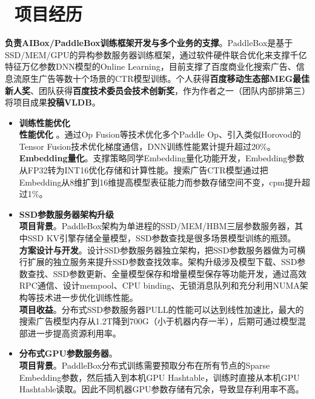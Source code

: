 \documentclass{resume}
\begin{document}
\section{\faUsers\ 项目经历}
\begin{onehalfspacing}
\textbf{负责AIBox/PaddleBox训练框架开发与多个业务的支撑}。PaddleBox是基于SSD/MEM/GPU的异构参数服务器训练框架，通过软件硬件联合优化来支撑千亿特征万亿参数DNN模型的Online Learning，目前支撑了百度商业化搜索广告、信息流原生广告等数十个场景的CTR模型训练。个人获得\textbf{百度移动生态部MEG最佳新人奖}、团队获得\textbf{百度技术委员会技术创新奖}，作为作者之一（团队内部排第三）将项目成果\textbf{投稿VLDB}。
\begin{itemize}%
\item \textbf{训练性能优化}
\\  \textbf{性能优化} 。通过Op Fusion等技术优化多个Paddle Op、引入类似Horovod的Tensor Fusion技术优化梯度通信，DNN训练性能累计提升超过20\%。
\\  \textbf{Embedding量化}。支撑策略同学Embedding量化功能开发，Embedding参数从FP32转为INT16优化存储和计算性能。搜索广告CTR模型通过把Embedding从8维扩到16维提高模型表征能力而参数存储空间不变，cpm提升超过1\%。
\item \textbf{SSD参数服务器架构升级}
\\ \textbf{项目背景}。PaddleBox架构为单进程的SSD/MEM/HBM三层参数服务器，其中SSD KV引擎存储全量模型，SSD参数查找是很多场景模型训练的瓶颈。%
\\ \textbf{方案设计与开发}。设计SSD参数服务器独立架构，把SSD参数服务器做为可横行扩展的独立服务来提升SSD参数查找效率。架构升级涉及模型下载、SSD参数查找、SSD参数更新、全量模型保存和增量模型保存等功能开发，通过高效RPC通信、设计mempool、CPU binding、无锁消息队列和充分利用NUMA架构等技术进一步优化训练性能。
\\ \textbf{项目收益}。分布式SSD参数服务器PULL的性能可以达到线性加速比，最大的搜索广告模型内存从1.2T降到700G（小于机器内存一半），后期可通过模型混部进一步提高资源利用率。%
\item \textbf{分布式GPU参数服务器}。
\\ \textbf{项目背景}。PaddleBox分布式训练需要预取分布在所有节点的Sparse Embedding参数，然后插入到本机GPU Hashtable，训练时直接从本机GPU Hashtable读取。因此不同机器GPU参数存储有冗余，导致显存利用率不高。

\end{itemize}
\end{onehalfspacing}
\end{document}
